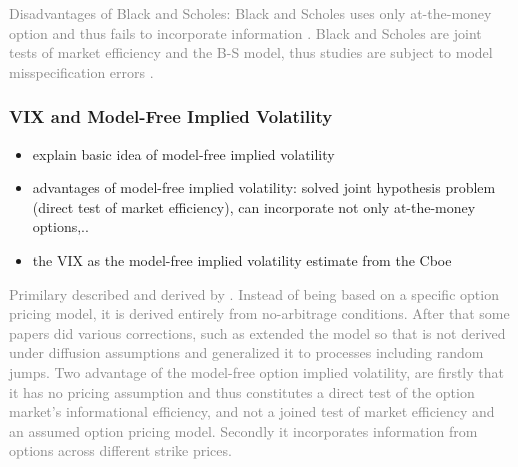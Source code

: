\textcolor{gray}{
Disadvantages of Black and Scholes: Black and Scholes uses only at-the-money option and thus fails to incorporate information \parencite{jiang2003}.
Black and Scholes are joint tests of market efficiency and the B-S model, thus studies are subject to model misspecification errors \parencite{jiang2003}.}

\subsubsection{VIX and Model-Free Implied Volatility}
\begin{itemize}\itemsep0pt
\item explain basic idea of model-free implied volatility
\item advantages of model-free implied volatility: solved joint hypothesis problem (direct test of market efficiency), can incorporate not only at-the-money options,..
\item the VIX as the model-free implied volatility estimate from the Cboe 
\end{itemize}

\textcolor{gray}{
Primilary described and derived by \citeauthor{britten2000}. Instead of being based on a specific option pricing model, it is derived entirely from no-arbitrage conditions. After that some papers did various corrections, such as \citeauthor{jiang2003} extended the model so that is not derived under diffusion assumptions and generalized it to processes including random jumps. Two advantage of the model-free option implied volatility, are firstly that it has no pricing assumption and thus constitutes a direct test of the option market's informational efficiency, and not a joined test of market efficiency and an assumed option pricing model. Secondly it incorporates information from options across different strike prices. }
